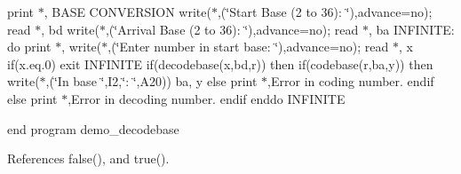 print $\ast$,\textquotesingle{} B\+A\+SE C\+O\+N\+V\+E\+R\+S\+I\+ON\textquotesingle{} write($\ast$,\textquotesingle{}(\char`\"{}\+Start   Base (2 to 36)\+: \char`\"{})\textquotesingle{},advance=\textquotesingle{}no\textquotesingle{}); read $\ast$, bd write($\ast$,\textquotesingle{}(\char`\"{}\+Arrival Base (2 to 36)\+: \char`\"{})\textquotesingle{},advance=\textquotesingle{}no\textquotesingle{}); read $\ast$, ba I\+N\+F\+I\+N\+I\+TE\+: do print $\ast$,\textquotesingle{}\textquotesingle{} write($\ast$,\textquotesingle{}(\char`\"{}\+Enter number in start base\+: \char`\"{})\textquotesingle{},advance=\textquotesingle{}no\textquotesingle{}); read $\ast$, x if(x.\+eq.\textquotesingle{}0\textquotesingle{}) exit I\+N\+F\+I\+N\+I\+TE if(decodebase(x,bd,r)) then if(codebase(r,ba,y)) then write($\ast$,\textquotesingle{}(\char`\"{}\+In base \char`\"{},I2,\char`\"{}\+: \char`\"{},A20)\textquotesingle{}) ba, y else print $\ast$,\textquotesingle{}Error in coding number.\textquotesingle{} endif else print $\ast$,\textquotesingle{}Error in decoding number.\textquotesingle{} endif enddo I\+N\+F\+I\+N\+I\+TE

end program demo\+\_\+decodebase 

References false(), and true().

